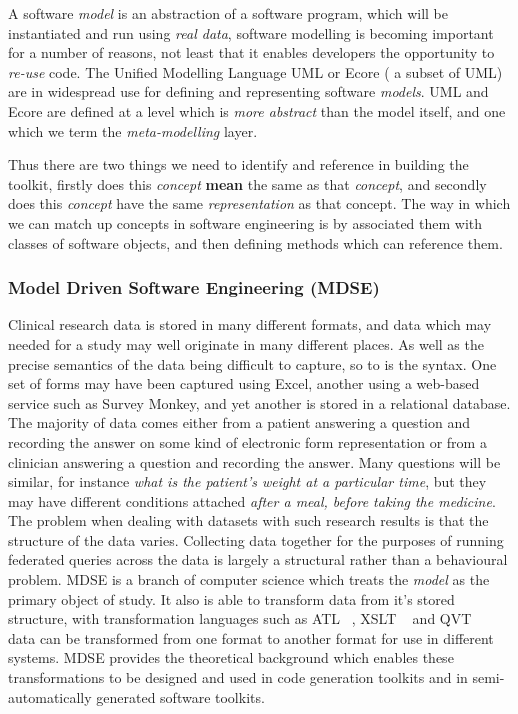 A software \emph{model} is an abstraction of a software program, which
will be instantiated and run using \emph{real data}, software
modelling is becoming important for a number of reasons, not least
that it enables developers the opportunity to \emph{re-use} code. The
Unified Modelling Language UML \cite{UML} or Ecore \cite{ECORE} ( a
subset of UML) are in widespread use for defining and representing
software \emph{models}. UML and Ecore are defined at a level which is
\emph{more abstract} than the model itself, and one which we term the
\emph{meta-modelling} layer.

Thus there are two things we need to identify and reference in
building the toolkit, firstly does this \emph{concept} \textbf{mean}
the same as that \emph{concept}, and secondly does this \emph{concept}
have the same \emph{representation} as that concept. The way in which
we can match up concepts in software engineering is by associated them
with classes of software objects, and then defining methods which can
reference them.

\subsubsection{Model Driven Software Engineering (MDSE)}
Clinical research data is stored in many different formats, and data which may needed for a study may well originate in many different places. As well as the precise semantics of the data being difficult to capture, so to is the syntax. One set of forms may have been captured using Excel, another using a web-based service such as Survey Monkey, and yet another is stored in a relational database. The majority of data comes either from a patient answering a question and recording the answer on some kind of electronic form representation or from a clinician answering a question and recording the answer. Many questions will be similar, for instance \emph{what is the patient's weight at a particular time}, but they may have different conditions attached \emph{after a meal, before taking the medicine}. The problem when dealing with datasets with such research results is that the structure of the data varies. Collecting data together for the purposes of running federated queries across the data is largely a structural rather than a behavioural problem. MDSE is a branch of computer science which treats the \emph{model} as the primary object of study. It also   is able to transform data from it's stored structure, with transformation languages such as ATL ~\cite{ATL}, XSLT ~\cite{XSLT} and QVT ~\cite{QVT} data can be transformed from one format to another format for use in different systems. MDSE provides the theoretical background which enables these transformations to be designed and used in code generation toolkits and in semi-automatically generated software toolkits. 

